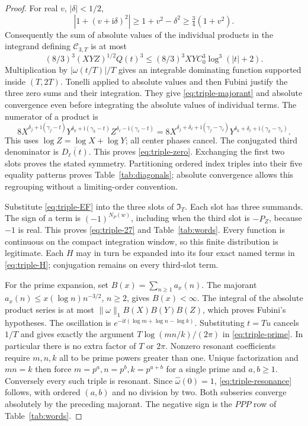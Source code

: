 \documentclass[11pt]{article}
\newcommand{\ii}{\mathrm i}
\newcommand{\CT}{\mathcal C_{3,T}}
\newcommand{\IT}{\mathfrak I_T}
\begin{document}
\begin{proof}
For real \(v\), \(|\delta|<1/2\),
\[
 |1+(v+\ii\delta)^2|\geq1+v^2-\delta^2
                         \geq\tfrac34(1+v^2).
\]
Consequently the sum of absolute values of the individual products
in the integrand defining \(\CT\) is at most
\[
 (8/3)^3(XYZ)^{1/2}Q(t)^3
 \leq(8/3)^3XY C_0^3\log^3(|t|+2).
\]
Multiplication by \(|\omega(t/T)|/T\) gives an integrable dominating
function supported inside \((T,2T)\). Tonelli applied to absolute values
and then Fubini justify the three zero sums and their integration.
They give \eqref{eq:triple-majorant} and absolute convergence even before
integrating the absolute values of individual terms.
The numerator of a product is
\[
 8X^{\delta_j+\ii(\gamma_j-t)}
   Y^{\delta_k+\ii(\gamma_k-t)}
   Z^{\delta_\ell-\ii(\gamma_\ell-t)}
 =8X^{\delta_j+\delta_\ell+\ii(\gamma_j-\gamma_\ell)}
    Y^{\delta_k+\delta_\ell+\ii(\gamma_k-\gamma_\ell)}.
\]
This uses \(\log Z=\log X+\log Y\); all center phases cancel.
The conjugated third denominator is \(\overline{D_\ell(t)}\).
This proves \eqref{eq:triple-zero}. Exchanging the first two slots proves
the stated symmetry. Partitioning ordered index triples into their five
equality patterns proves Table~\ref{tab:diagonals}; absolute convergence
allows this regrouping without a limiting-order convention.

Substitute \eqref{eq:triple-EF} into the three slots of \(\IT\).
Each slot has three summands. The sign of a term is
\((-1)^{N_P(w)}\), including when the third slot is \(-P_Z\),
because \(-1\) is real. This proves \eqref{eq:triple-27} and
Table~\ref{tab:words}. Every function is continuous on the compact
integration window, so this finite distribution is legitimate.
Each \(H\) may in turn be expanded into its four exact named terms in
\eqref{eq:triple-H}; conjugation remains on every third-slot term.

For the prime expansion, set \(B(x)=\sum_{n\geq1}a_x(n)\).
The majorant
\(a_x(n)\leq x(\log n)n^{-3/2}\), \(n\geq2\), gives \(B(x)<\infty\).
The integral of the absolute product series is at most
\(\|\omega\|_1 B(X)B(Y)B(Z)\), which proves Fubini's hypotheses.
The oscillation is \(e^{-\ii t(\log m+\log n-\log k)}\).
Substituting \(t=Tu\) cancels \(1/T\) and gives exactly the argument
\(T\log(mn/k)/(2\pi)\) in \eqref{eq:triple-prime}.
In particular there is no extra factor of \(T\) or \(2\pi\).
Nonzero resonant coefficients require \(m,n,k\) all to be prime powers
greater than one. Unique factorization and \(mn=k\) then force
\(m=p^a,n=p^b,k=p^{a+b}\) for a single prime and \(a,b\geq1\).
Conversely every such triple is resonant. Since \(\widehat\omega(0)=1\),
\eqref{eq:triple-resonance} follows, with ordered \((a,b)\) and no
division by two. Both subseries converge absolutely by the preceding
majorant. The negative sign is the \(PPP\) row of Table~\ref{tab:words}.
\end{proof}
\end{document}
